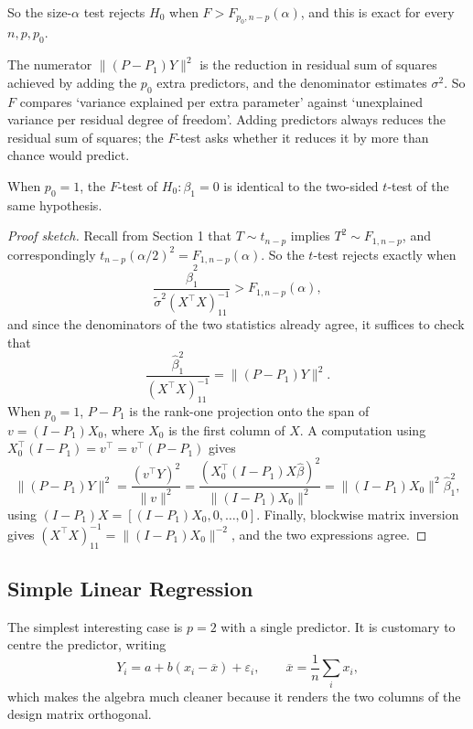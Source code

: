 So the size-$\alpha$ test rejects $H_0$ when $F > F_{p_0,n-p}(\alpha)$, and this is exact for every $n, p, p_0$.

\begin{remark}
  The numerator $\|(P-P_1)Y\|^2$ is the reduction in residual sum of squares achieved by adding the $p_0$ extra predictors, and the denominator estimates $\sigma^2$. So $F$ compares `variance explained per extra parameter' against `unexplained variance per residual degree of freedom'. Adding predictors always reduces the residual sum of squares; the $F$-test asks whether it reduces it by more than chance would predict.
\end{remark}

\begin{proposition}
  When $p_0 = 1$, the $F$-test of $H_0 : \beta_1 = 0$ is identical to the two-sided $t$-test of the same hypothesis.
\end{proposition}
\begin{proof}[Proof sketch]
  Recall from Section 1 that $T\sim t_{n-p}$ implies $T^2\sim F_{1,n-p}$, and correspondingly $t_{n-p}(\alpha/2)^2 = F_{1,n-p}(\alpha)$. So the $t$-test rejects exactly when
  $$
  \frac{\hat\beta_1^2}{\tilde\sigma^2(X^\top X)^{-1}_{11}} > F_{1,n-p}(\alpha),
  $$
  and since the denominators of the two statistics already agree, it suffices to check that
  $$
  \frac{\hat\beta_1^2}{(X^\top X)^{-1}_{11}} = \|(P-P_1)Y\|^2.
  $$
  When $p_0 = 1$, $P - P_1$ is the rank-one projection onto the span of $v = (I-P_1)X_0$, where $X_0$ is the first column of $X$. A computation using $X_0^\top(I-P_1) = v^\top = v^\top(P - P_1)$ gives
  $$
  \|(P-P_1)Y\|^2 = \frac{(v^\top Y)^2}{\|v\|^2} = \frac{\left(X_0^\top(I-P_1)X\hat\beta\right)^2}{\|(I-P_1)X_0\|^2} = \|(I-P_1)X_0\|^2\hat\beta_1^2,
  $$
  using $(I-P_1)X = \left[(I-P_1)X_0, 0,\dots,0\right]$. Finally, blockwise matrix inversion gives $(X^\top X)^{-1}_{11} = \|(I-P_1)X_0\|^{-2}$, and the two expressions agree.
\end{proof}

\subsection{Simple Linear Regression}

The simplest interesting case is $p = 2$ with a single predictor. It is customary to centre the predictor, writing
$$
Y_i = a + b\left(x_i - \overline{x}\right) + \varepsilon_i, \qquad \overline{x} = \frac1n\sum_i x_i,
$$
which makes the algebra much cleaner because it renders the two columns of the design matrix orthogonal.

